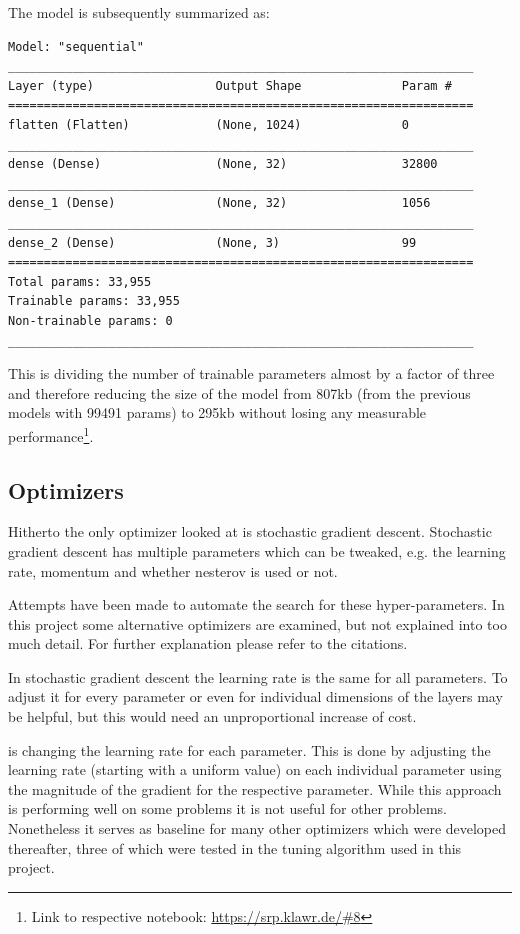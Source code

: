The model is subsequently summarized as:
\begin{lstlisting}
Model: "sequential"
_________________________________________________________________
Layer (type)                 Output Shape              Param #   
=================================================================
flatten (Flatten)            (None, 1024)              0         
_________________________________________________________________
dense (Dense)                (None, 32)                32800     
_________________________________________________________________
dense_1 (Dense)              (None, 32)                1056      
_________________________________________________________________
dense_2 (Dense)              (None, 3)                 99        
=================================================================
Total params: 33,955
Trainable params: 33,955
Non-trainable params: 0
_________________________________________________________________
\end{lstlisting}

This is dividing the number of trainable parameters almost by a factor of three and therefore reducing the size of the model from 807kb (from the previous models with 99491 params) to 295kb without losing any measurable performance\footnote{Link to respective notebook: \url{https://srp.klawr.de/\#8}}.

\subsection{Optimizers}

Hitherto the only optimizer looked at is stochastic gradient descent.
Stochastic gradient descent has multiple parameters which can be tweaked, e.g. the learning rate, momentum and whether nesterov is used or not.

Attempts have been made to automate the search for these hyper-parameters.
In this project some alternative optimizers are examined, but not explained into too much detail.
For further explanation please refer to the citations.

In stochastic gradient descent the learning rate is the same for all parameters.
To adjust it for every parameter or even for individual dimensions of the layers may be helpful, but this would need an unproportional increase of cost.

 \cite{Duchi2010} is changing the learning rate for each parameter.
This is done by adjusting the learning rate (starting with a uniform value) on each individual parameter using the magnitude of the gradient for the respective parameter.
While this approach is performing well on some problems it is not useful for other problems.
Nonetheless it serves as baseline for many other optimizers which were developed thereafter, three of which were tested in the tuning algorithm used in this project.

